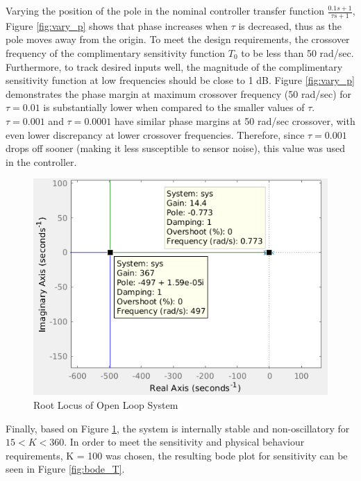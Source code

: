 \documentclass[11pt, a4paper,twocolumn]{article}
\begin{document}
			Varying the position of the pole in the nominal controller transfer function $ \frac{0.1s + 1}{\tau s + 1} $, Figure \ref{fig:vary_p} shows that phase increases when $ \tau $ is decreased, thus as the pole moves away from the origin. To meet the design requirements, the crossover frequency of the complimentary sensitivity function $T_0$ to be less than 50 rad/sec. Furthermore, to track desired inputs well, the magnitude of  the complimentary sensitivity function at low frequencies should be close to 1 dB. Figure \ref{fig:vary_p} demonstrates the phase margin at maximum crossover frequency (50 rad/sec) for $ \tau = 0.01 $ is substantially lower when compared to the smaller values of $ \tau $. $ \tau = 0.001 $ and $ \tau = 0.0001 $ have similar phase margins at 50 rad/sec crossover, with even lower discrepancy at lower crossover frequencies. Therefore, since $ \tau = 0.001 $ drops off sooner (making it less susceptible to sensor noise), this value was used in the controller.

			\begin{figure}[ht!]
			\centering
			\includegraphics[scale=0.4]{rlocus_sys}
			\caption{Root Locus of Open Loop System}
			\label{fig:rlocus_sys}
			\end{figure}									
			
			Finally, based on Figure \ref{fig:rlocus_sys}, the system is internally stable and non-oscillatory for $ 15 < K < 360 $. In order to meet the sensitivity and physical behaviour requirements, K = 100 was chosen, the resulting bode plot for sensitivity can be seen in Figure \ref{fig:bode_T}. 
			
\end{document}
